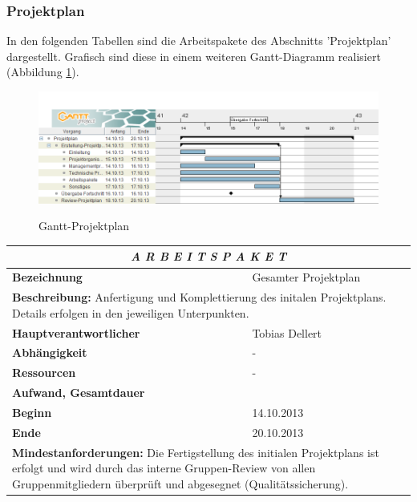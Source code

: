 \documentclass[fontsize=12pt,paper=a4,twoside]{scrartcl}
\begin{document}
\subsubsection{Projektplan}\label{aps}

In den folgenden Tabellen sind die Arbeitspakete des Abschnitts 'Projektplan' dargestellt. Grafisch sind diese in einem weiteren Gantt-Diagramm realisiert (Abbildung \ref{Gantt-Projektplan}). \\

\begin{figure}[htbp]
\caption{Gantt-Projektplan}
\includegraphics[scale=0.56]{Gantt-Projektplan.png}
\newline
\label{Gantt-Projektplan}
\end{figure}


\begin{tabular}{p{7.5cm}|p{7.5cm}}\toprule
\multicolumn{2}{c}{\textbf{\textit{A R B E I T S P A K E T \quad 1}}} \\ \toprule \hline
\textbf{Bezeichnung} & Gesamter Projektplan\\\hline
\multicolumn{2}{p{15cm}}{\textbf{Beschreibung:} \newline 
Anfertigung und Komplettierung des initalen Projektplans. Details erfolgen in den jeweiligen Unterpunkten.}  \\\hline
\textbf{Hauptverantwortlicher} & Tobias Dellert\\\hline
\textbf{Abhängigkeit} & -\\\hline
\textbf{Ressourcen} & -\\\hline
\textbf{Aufwand, Gesamtdauer} & \\\hline
\textbf{Beginn} & 14.10.2013 \\\hline
\textbf{Ende} & 20.10.2013\\\hline
\multicolumn{2}{p{15cm}}{\textbf{Mindestanforderungen: } \newline
Die Fertigstellung des initialen Projektplans ist erfolgt und wird durch das interne Gruppen-Review von allen Gruppenmitgliedern überprüft und abgesegnet (Qualitätssicherung).}  \\ \toprule
\end{tabular} \\\\
\end{document}

